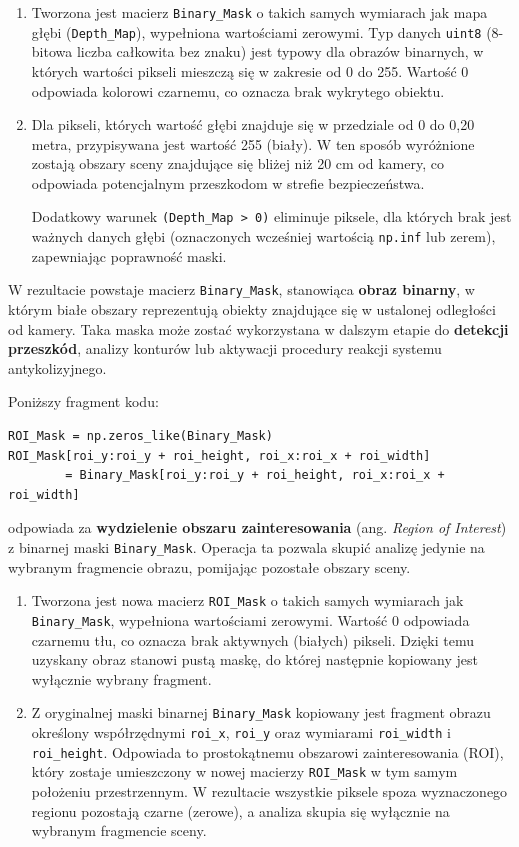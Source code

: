 \documentclass[magisterska]{pracadypl}
\begin{document}
\begin{enumerate}
    \item Tworzona jest macierz \texttt{Binary\_Mask} o takich samych wymiarach jak mapa głębi (\texttt{Depth\_Map}), wypełniona wartościami zerowymi. Typ danych \texttt{uint8} (8-bitowa liczba całkowita bez znaku) jest typowy dla obrazów binarnych, w których wartości pikseli mieszczą się w zakresie od 0 do 255. Wartość 0 odpowiada kolorowi czarnemu, co oznacza brak wykrytego obiektu.

    \item Dla pikseli, których wartość głębi znajduje się w przedziale od 0 do 0{,}20 metra, przypisywana jest wartość 255 (biały). W ten sposób wyróżnione zostają obszary sceny znajdujące się bliżej niż 20 cm od kamery, co odpowiada potencjalnym przeszkodom w strefie bezpieczeństwa. 

    Dodatkowy warunek \texttt{(Depth\_Map > 0)} eliminuje piksele, dla których brak jest ważnych danych głębi (oznaczonych wcześniej wartością \texttt{np.inf} lub zerem), zapewniając poprawność maski.
\end{enumerate}

W rezultacie powstaje macierz \texttt{Binary\_Mask}, stanowiąca \textbf{obraz binarny}, w którym białe obszary reprezentują obiekty znajdujące się w ustalonej odległości od kamery. Taka maska może zostać wykorzystana w dalszym etapie do \textbf{detekcji przeszkód}, analizy konturów lub aktywacji procedury reakcji systemu antykolizyjnego.

Poniższy fragment kodu:

\begin{lstlisting}[style=mypython]
ROI_Mask = np.zeros_like(Binary_Mask)
ROI_Mask[roi_y:roi_y + roi_height, roi_x:roi_x + roi_width] 
        = Binary_Mask[roi_y:roi_y + roi_height, roi_x:roi_x + roi_width]
\end{lstlisting}

odpowiada za \textbf{wydzielenie obszaru zainteresowania} (ang. \textit{Region of Interest}) z binarnej maski \texttt{Binary\_Mask}. Operacja ta pozwala skupić analizę jedynie na wybranym fragmencie obrazu, pomijając pozostałe obszary sceny.

\begin{enumerate}
    \item Tworzona jest nowa macierz \texttt{ROI\_Mask} o takich samych wymiarach jak \texttt{Binary\_Mask}, wypełniona wartościami zerowymi. Wartość 0 odpowiada czarnemu tłu, co oznacza brak aktywnych (białych) pikseli. Dzięki temu uzyskany obraz stanowi pustą maskę, do której następnie kopiowany jest wyłącznie wybrany fragment.

    \item Z oryginalnej maski binarnej \texttt{Binary\_Mask} kopiowany jest fragment obrazu określony współrzędnymi \texttt{roi\_x}, \texttt{roi\_y} oraz wymiarami \texttt{roi\_width} i \texttt{roi\_height}. 
    Odpowiada to prostokątnemu obszarowi zainteresowania (ROI), który zostaje umieszczony w nowej macierzy \texttt{ROI\_Mask} w tym samym położeniu przestrzennym. 
    W rezultacie wszystkie piksele spoza wyznaczonego regionu pozostają czarne (zerowe), a analiza skupia się wyłącznie na wybranym fragmencie sceny.
\end{enumerate}
\end{document}
